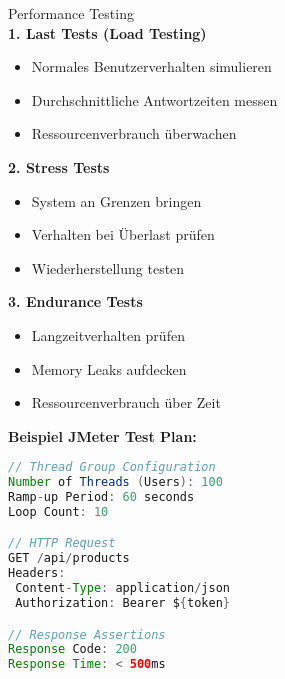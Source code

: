 \begin{KR}{Performance Testing}\\
\textbf{1. Last Tests (Load Testing)}
\begin{itemize}
   \item Normales Benutzerverhalten simulieren
   \item Durchschnittliche Antwortzeiten messen
   \item Ressourcenverbrauch überwachen
\end{itemize}

\textbf{2. Stress Tests}
\begin{itemize}
   \item System an Grenzen bringen
   \item Verhalten bei Überlast prüfen
   \item Wiederherstellung testen
\end{itemize}

\textbf{3. Endurance Tests}
\begin{itemize}
   \item Langzeitverhalten prüfen
   \item Memory Leaks aufdecken
   \item Ressourcenverbrauch über Zeit
\end{itemize}

\textbf{Beispiel JMeter Test Plan:}
\begin{lstlisting}[language=Java, style=basesmol]
// Thread Group Configuration
Number of Threads (Users): 100
Ramp-up Period: 60 seconds
Loop Count: 10

// HTTP Request
GET /api/products
Headers:
 Content-Type: application/json
 Authorization: Bearer ${token}

// Response Assertions
Response Code: 200
Response Time: < 500ms
\end{lstlisting}
\end{KR}







